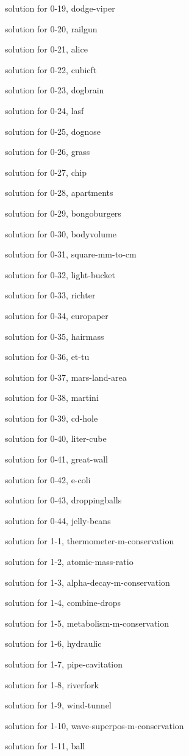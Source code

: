 \documentclass{problems}
\begin{document}
solution for 0-19, dodge-viper

solution for 0-20, railgun

solution for 0-21, alice

solution for 0-22, cubicft

solution for 0-23, dogbrain

solution for 0-24, lasf

solution for 0-25, dognose

solution for 0-26, grass

solution for 0-27, chip

solution for 0-28, apartments

solution for 0-29, bongoburgers

solution for 0-30, bodyvolume

solution for 0-31, square-mm-to-cm

solution for 0-32, light-bucket

solution for 0-33, richter

solution for 0-34, europaper

solution for 0-35, hairmass

solution for 0-36, et-tu

solution for 0-37, mars-land-area

solution for 0-38, martini

solution for 0-39, cd-hole

solution for 0-40, liter-cube

solution for 0-41, great-wall

solution for 0-42, e-coli

solution for 0-43, droppingballs

solution for 0-44, jelly-beans

solution for 1-1, thermometer-m-conservation

solution for 1-2, atomic-mass-ratio

solution for 1-3, alpha-decay-m-conservation

solution for 1-4, combine-drops

solution for 1-5, metabolism-m-conservation

solution for 1-6, hydraulic

solution for 1-7, pipe-cavitation

solution for 1-8, riverfork

solution for 1-9, wind-tunnel

solution for 1-10, wave-superpos-m-conservation

solution for 1-11, ball
\end{document}
